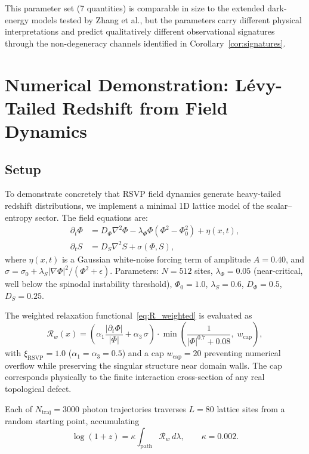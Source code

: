 \documentclass[12pt,a4paper]{article}
\theoremstyle{remark}
\begin{document}
This parameter set (7 quantities) is comparable in size to the extended
dark-energy models tested by Zhang et al., but the parameters carry different
physical interpretations and predict qualitatively different observational
signatures through the non-degeneracy channels identified in
Corollary~\ref{cor:signatures}.


\section{Numerical Demonstration: Lévy-Tailed Redshift from Field Dynamics}
\label{app:simulation}

\subsection{Setup}

To demonstrate concretely that RSVP field dynamics generate heavy-tailed
redshift distributions, we implement a minimal 1D lattice model of the
scalar--entropy sector. The field equations are:
\begin{align}
\partial_t \Phi &= D_\Phi \nabla^2\Phi - \lambda_\Phi\Phi(\Phi^2 - \Phi_0^2) + \eta(x,t), \\
\partial_t S    &= D_S\nabla^2 S + \sigma(\Phi, S),
\end{align}
where $\eta(x,t)$ is a Gaussian white-noise forcing term of amplitude
$A = 0.40$, and $\sigma = \sigma_0 + \lambda_S|\nabla\Phi|^2/(\Phi^2 + \epsilon)$.
Parameters: $N = 512$ sites, $\lambda_\Phi = 0.05$ (near-critical, well below
the spinodal instability threshold), $\Phi_0 = 1.0$, $\lambda_S = 0.6$,
$D_\Phi = 0.5$, $D_S = 0.25$.

The weighted relaxation functional~\eqref{eq:R_weighted} is evaluated as
\begin{equation}
\mathcal{R}_w(x) = \left(\alpha_1\frac{|\partial_t\Phi|}{|\Phi|}
+ \alpha_3\,\sigma\right) \cdot
\min\!\left(\frac{1}{|\Phi|^{0.7} + 0.08},\; w_{\mathrm{cap}}\right),
\end{equation}
with $\xi_{\mathrm{RSVP}} = 1.0$ ($\alpha_1 = \alpha_3 = 0.5$) and a cap
$w_{\mathrm{cap}} = 20$ preventing numerical overflow while preserving the
singular structure near domain walls. The cap corresponds physically to
the finite interaction cross-section of any real topological defect.

Each of $N_{\mathrm{traj}} = 3000$ photon trajectories traverses $L = 80$
lattice sites from a random starting point, accumulating
\begin{equation}
\log(1+z) = \kappa\int_{\mathrm{path}}\mathcal{R}_w\,d\lambda, \qquad \kappa = 0.002.
\end{equation}
\end{document}
